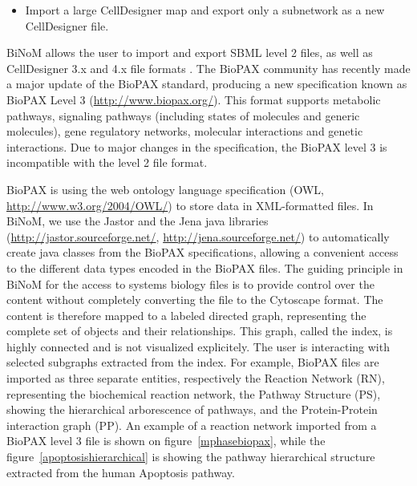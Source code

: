 \documentclass[10pt]{bmc_article}
\newenvironment{bmcformat}{\baselineskip20pt\sloppy\setboolean{publ}{false}}{\baselineskip20pt\sloppy}
\begin{document}
\begin{bmcformat}
\begin{itemize}
\item Import a large CellDesigner map and export only a subnetwork as a new CellDesigner file.  

\end{itemize}

BiNoM allows the user to import and export SBML level 2 files, as well as
CellDesigner 3.x and 4.x file formats \cite{zinovyev2008binom}. The BioPAX
community has recently made a major update of the BioPAX standard, producing a
new specification known as BioPAX Level 3 (\url{http://www.biopax.org/}). This
format supports metabolic pathways, signaling pathways (including states of molecules
and generic molecules), gene regulatory networks, molecular interactions and
genetic interactions. Due to major changes in the
specification, the BioPAX level 3 is incompatible with the level 2 file format.

BioPAX is using the web ontology language specification (OWL,
\url{http://www.w3.org/2004/OWL/}) to store data in XML-formatted files. In
BiNoM, we use the Jastor and the Jena java libraries
(\url{http://jastor.sourceforge.net/}, \url{http://jena.sourceforge.net/}) to
automatically create java classes from the BioPAX specifications, allowing a
convenient access to the different data types encoded in the BioPAX files. The
guiding principle in BiNoM for the
access to systems biology files is to provide control over the content without
completely converting the file to the Cytoscape format. The content is therefore
mapped to a labeled directed graph, representing the complete set of objects and
their relationships. This graph, called the index, is highly connected and is
not visualized explicitely. The user is interacting with selected subgraphs
extracted from the index. For example, BioPAX files are imported as three
separate entities, respectively the Reaction Network (RN), representing the
biochemical reaction network, the Pathway Structure (PS), showing the
hierarchical arborescence of pathways, and the Protein-Protein interaction graph
(PP). An example of a reaction network imported from a BioPAX level 3 file is
shown on figure~\ref{mphasebiopax}, while the figure~\ref{apoptosishierarchical}
is showing the pathway hierarchical
structure extracted from the human Apoptosis pathway.  



\end{bmcformat}
\end{document}

